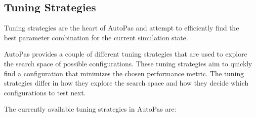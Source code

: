 \subsection{Tuning Strategies}

Tuning strategies are the heart of AutoPas and attempt to efficiently find the best parameter combination for the current simulation state.

AutoPas provides a couple of different tuning strategies that are used to explore the search space of possible configurations. These tuning strategies aim to quickly find a configuration that minimizes the chosen performance metric. The tuning strategies differ in how they explore the search space and how they decide which configurations to test next.

The currently available tuning strategies in AutoPas are:


